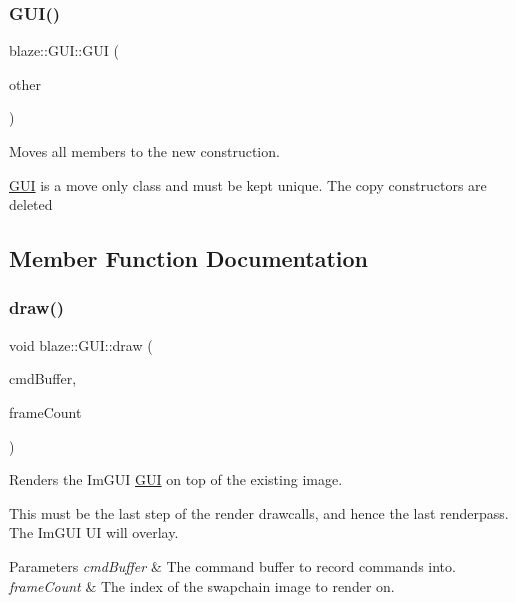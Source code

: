 \subsubsection{\texorpdfstring{G\+U\+I()}{GUI()}\hspace{0.1cm}{\footnotesize\ttfamily [2/2]}}
{\footnotesize\ttfamily blaze\+::\+G\+U\+I\+::\+G\+UI (\begin{DoxyParamCaption}\item[{\hyperlink{classblaze_1_1GUI}{G\+UI} \&\&}]{other }\end{DoxyParamCaption})\hspace{0.3cm}{\ttfamily [noexcept]}}



Moves all members to the new construction. 

\hyperlink{classblaze_1_1GUI}{G\+UI} is a move only class and must be kept unique. The copy constructors are deleted 

\subsection{Member Function Documentation}
\mbox{\label{classblaze_1_1GUI_aa73bd1251e8c44e3bc98fe1f4f8b25a5}} 
\subsubsection{\texorpdfstring{draw()}{draw()}}
{\footnotesize\ttfamily void blaze\+::\+G\+U\+I\+::draw (\begin{DoxyParamCaption}\item[{Vk\+Command\+Buffer}]{cmd\+Buffer,  }\item[{int}]{frame\+Count }\end{DoxyParamCaption})}



Renders the Im\+G\+UI \hyperlink{classblaze_1_1GUI}{G\+UI} on top of the existing image. 

This must be the last step of the render drawcalls, and hence the last renderpass. The Im\+G\+UI UI will overlay.


\begin{DoxyParams}{Parameters}
{\em cmd\+Buffer} & The command buffer to record commands into. \\
\hline
{\em frame\+Count} & The index of the swapchain image to render on. \\
\hline
\end{DoxyParams}
\mbox{\label{classblaze_1_1GUI_a510ebaca6e980af7e3355ae3365d7c68}} 

